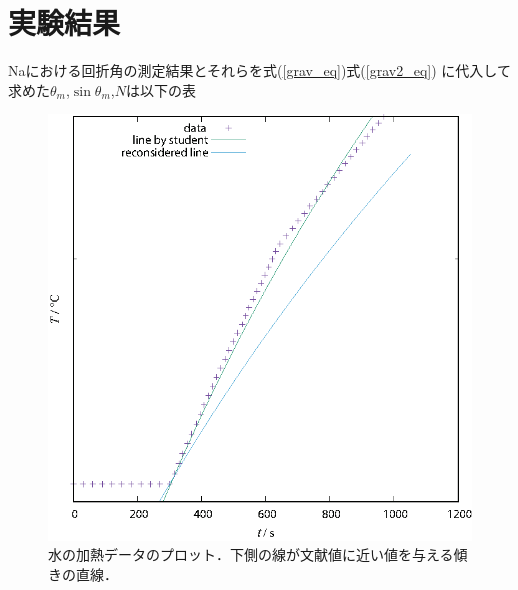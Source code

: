 \documentclass[a4paper,10pt]{jarticle}
\begin{document}
\section{実験結果}


Naにおける回折角の測定結果とそれらを式(\ref{grav_eq})式(\ref{grav2_eq})
に代入して求めた$\theta_m$,$\sin\theta_m$,$N$は以下の表


\begin{figure}[ht]
\begin{center}
 \includegraphics[scale=0.8]{hcap.eps}
 \caption{水の加熱データのプロット．下側の線が文献値に近い値を与える傾きの直線．}
 \label{hcap-plt}
\end{center}
\end{figure}

\newpage

\end{document}
